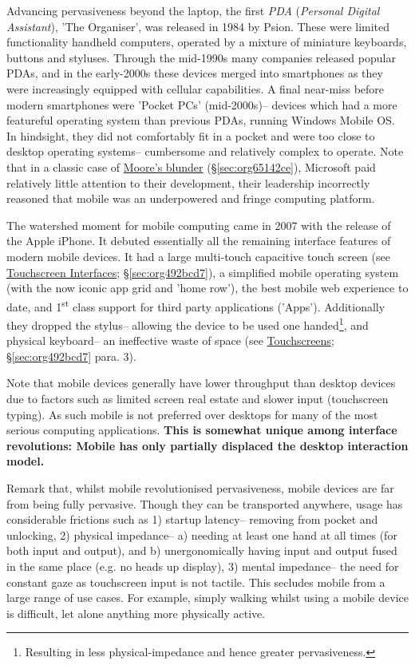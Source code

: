 \documentclass[logo,bsc,singlespacing,parskip]{infthesis}
\begin{document}
Advancing pervasiveness beyond the laptop, the first \emph{PDA} (\emph{Personal Digital Assistant}), 'The Organiser', was released in 1984 by Psion.
These were limited functionality handheld computers, operated by a mixture of miniature keyboards, buttons and styluses.
Through the mid-1990s many companies released popular PDAs, and in the early-2000s these devices merged into smartphones as they were increasingly equipped with cellular capabilities.
A final near-miss before modern smartphones were 'Pocket PCs' (mid-2000s)-- devices which had a more featureful operating system than previous PDAs, running Windows Mobile OS.
In hindsight, they did not comfortably fit in a pocket and were too close to desktop operating systems-- cumbersome and relatively complex to operate.
Note that in a classic case of \hyperref[sec:org65142ce]{Moore's blunder} (\S \ref{sec:org65142ce}), Microsoft paid relatively little attention to their development, their leadership incorrectly reasoned that mobile was an underpowered and fringe computing platform.

The watershed moment for mobile computing came in 2007 with the release of the Apple iPhone.
It debuted essentially all the remaining interface features of modern mobile devices.
It had a large multi-touch capacitive touch screen (see \hyperref[sec:org492bcd7]{Touchscreen Interfaces}; \S \ref{sec:org492bcd7}), a simplified mobile operating system (with the now iconic app grid and 'home row'), the best mobile web experience to date, and 1\textsuperscript{st} class support for third party applications ('Apps').
Additionally they dropped the stylus-- allowing the device to be used one handed\footnote{Resulting in less physical-impedance and hence greater pervasiveness.}, and physical keyboard-- an ineffective waste of space (see \hyperref[sec:org492bcd7]{Touchscreens}; \S \ref{sec:org492bcd7} para. 3).

Note that mobile devices generally have lower throughput than desktop devices due to factors such as limited screen real estate and slower input (touchscreen typing).
As such mobile is not preferred over desktops for many of the most serious computing applications.
\textbf{This is somewhat unique among interface revolutions: Mobile has only partially displaced the desktop interaction model.}

Remark that, whilst mobile revolutionised pervasiveness, mobile devices are far from being fully pervasive.
Though they can be transported anywhere, usage has considerable frictions such as 1) startup latency-- removing from pocket and unlocking, 2) physical impedance-- a) needing at least one hand at all times (for both input and output), and b) unergonomically having input and output fused in the same place (e.g. no heads up display), 3) mental impedance-- the need for constant gaze as touchscreen input is not tactile.
This secludes mobile from a large range of use cases.
For example, simply walking whilst using a mobile device is difficult, let alone anything more physically active.
\end{document}
